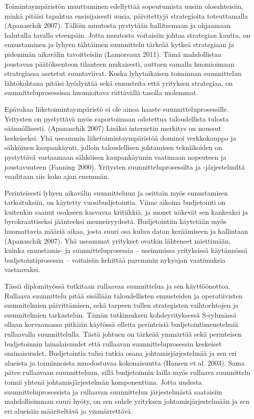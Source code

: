 \documentclass[12pt,a4paper,oneside,pdftex]{report}
\begin{document}
Toimintaympäristön muuttuminen edellyttää sopeutumista uusiin olosuhteisiin, minkä pitäisi tapahtua ensisijaisesti uusia, päivitettyjä strategioita toteuttamalla (Apanaschik 2007). Tällöin muutosta pystytään hallitsemaan ja ohjaamaan halutulla tavalla eteenpäin. Jotta muutosta voitaisiin johtaa strategian kautta, on ennustaminen ja lyhyen tähtäimen suunnittelu tärkeää kytkeä strategiaan ja pidemmän aikavälin tavoitteisiin (Lamoreaux 2011). Tämä mahdollistaa joustavan päätöksenteon tilanteen mukaisesti, auttaen samalla huomioimaan strategiassa asetetut suuntaviivat. Koska lyhytaikaisen toiminnan suunnittelun lähtökohtana pitäisi hyödyntää sekä ennusteita että yrityksen strategiaa, on suunnitteluprosessissa huomioitava riittävällä tasolla molemmat.

Epävakaa liiketoimintaympäristö ei ole ainoa haaste suunnitteluprosessille. Yritysten on pystyttävä myös raportoimaan odotettua taloudellista tulosta säännöllisesti. (Apanaschik 2007) Lisäksi internetin merkitys on noussut keskeiseksi. Yhä useammin liiketoimintaympäristöä dominoi verkkokauppa ja sähköinen kaupankäynti, jolloin taloudellisen johtamisen tekniikoiden on pystyttävä vastaamaan sähköisen kaupankäynnin vaatimaan nopeuteen ja joustavuuteen (Fanning 2000). Yritysten suunnitteluprosessilta ja -järjestelmiltä vaaditaan siis koko ajan enemmän.

Perinteisesti lyhyen aikavälin suunnitteluun ja osittain myös ennustamisen tarkoituksiin, on käytetty vuosibudjetointia. Viime aikoina budjetointi on kuitenkin saanut osakseen kasvavaa kritiikkiä, ja monet näkevät sen kankeaksi ja byrokraattiseksi jäänteeksi menneisyydestä. Budjetointiin käytetään myös huomattavia määriä aikaa, josta suuri osa kuluu datan keräämiseen ja hallintaan (Apanaschik 2007). Yhä useammat yritykset ovatkin lähteneet miettimään, kuinka ennustamis- ja suunnitteluprosessia – useimmissa yrityksissä käytännössä budjetointiprosessia – voitaisiin kehittää paremmin nykyajan vaatimuksia vastaavaksi.

Tässä diplomityössä tutkitaan rullaavaa suunnittelua ja sen käyttöönottoa. Rullaava suunnittelu pitää sisällään taloudellisten ennusteiden ja operatiivisten suunnitelmien päivittämisen, sekä tarpeen tullen strategisten vaihtoehtojen ja suunnitelmien tarkastelun. Tämän tutkimuksen kohdeyrityksessä S-ryhmässä ollaan korvaamassa pitkään käytössä olleita perinteisiä budjetointimenetelmiä rullaavalla suunnittelulla. Tästä johtuen on tärkeää ymmärtää sekä perinteisen budjetoinnin lainalaisuudet että rullaavan suunnitteluprosessin keskeiset ominaisuudet. Budjetointia tulisi tutkia osana johtamisjärjestelmää ja sen eri alueista ja toiminnoista muodostuvaa kokonaisuutta (Hansen et al. 2003). Sama pätee rullaavaan suunnitteluun, sillä budjetoinnin lailla myös rullaava suunnittelu toimii yhtenä johtamisjärjestelmän komponenttina. Jotta uudesta suunnitteluprosessista ja rullaavan suunnittelun järjestelmästä saataisiin mahdollisimman suuri hyöty, on sen suhde yrityksen johtamisjärjestelmään ja sen eri alueisiin määriteltävä ja ymmärrettävä.
\end{document}
